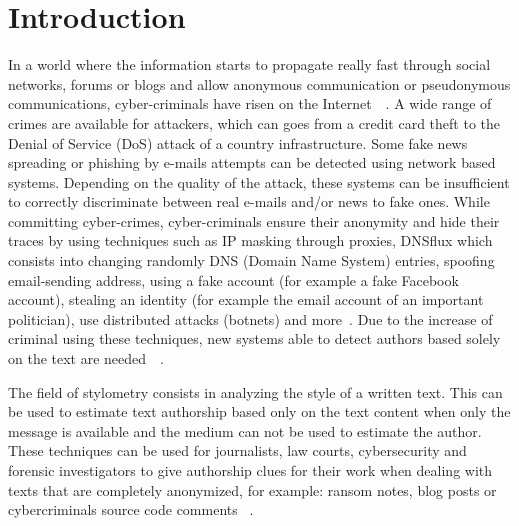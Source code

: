 
\section{Introduction \label{sec:introduction}}

In a world where the information starts to propagate really fast through social networks, forums or blogs and allow anonymous communication or pseudonymous communications, cyber-criminals have risen on the Internet~\cite{automated_unsupervised}~\cite{kocher_pan16}.
A wide range of crimes are available for attackers, which can goes from a credit card theft to the Denial of Service (DoS) attack of a country infrastructure.
Some fake news spreading or phishing by e-mails attempts can be detected using network based systems.
Depending on the quality of the attack, these systems can be insufficient to correctly discriminate between real e-mails and/or news to fake ones.
While committing cyber-crimes, cyber-criminals ensure their anonymity and hide their traces by using techniques such as IP masking through proxies, DNSflux which consists into changing randomly DNS (Domain Name System) entries, spoofing email-sending address, using a fake account (for example a fake Facebook account), stealing an identity (for example the email account of an important politician), use distributed attacks (botnets) and more~\cite{attribution_in_cyberspace}.
Due to the increase of criminal using these techniques, new systems able to detect authors based solely on the text are needed~\cite{automated_unsupervised}~\cite{unine_pan20_fake_news}.

The field of stylometry consists in analyzing the style of a written text.
This can be used to estimate text authorship based only on the text content when only the message is available and the medium can not be used to estimate the author.
These techniques can be used for journalists, law courts, cybersecurity and forensic investigators to give authorship clues for their work when dealing with texts that are completely anonymized, for example: ransom notes, blog posts or cybercriminals source code comments ~\cite{pan16_clustering_site}.

